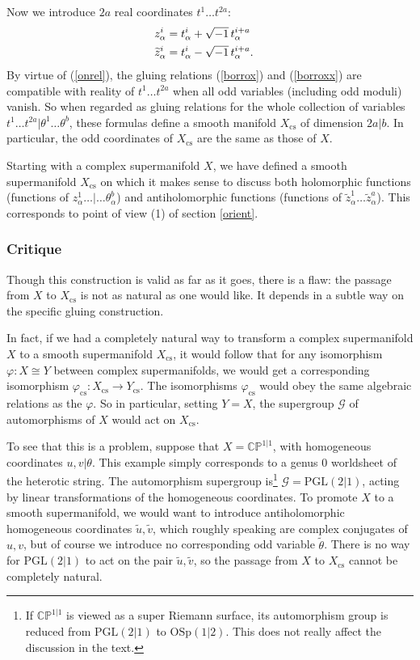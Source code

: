 \documentclass[11pt,a4paper]{article}
\def\t{{ \sf t}}
\def\cs{{\mathrm{cs}}}
\def\tilde{\widetilde}
\def\G{{\mathcal G}}
\def\CP{{\mathbb{CP}}}
\def\t{\tilde }
\def\tilde{\widetilde}
\begin{document}
Now we introduce $2a$ real coordinates $t^1\dots t^{2a}$:
\begin{align}\label{dorsko} z^i_\alpha& = t^i_\alpha+\sqrt{-1}\, t^{i+a}_\alpha \cr
                                         \t z^i_\alpha& = t^i_\alpha -\sqrt{-1}\,t^{i+a}_\alpha. \end{align}
By virtue of (\ref{onrel}), the gluing relations (\ref{borrox}) and (\ref{borroxx}) are compatible with reality of $t^1\dots t^{2a}$ when all odd variables (including odd moduli) vanish.
So when regarded as gluing relations for the whole collection of variables $t^1\dots t^{2a}|\theta^1\dots\theta^b$, these formulas
define a smooth manifold $X_{\cs}$ of dimension $2a|b$.  In particular, the odd coordinates of $X_\cs$ are the same as those of $X$.

Starting with a complex supermanifold $X$, we have defined a smooth supermanifold $X_\cs$ on which it makes sense to discuss both holomorphic functions (functions of $z^1_\alpha\dots|\dots
\theta^b_\alpha$) and antiholomorphic functions (functions of $\t z_\alpha^1\dots \t z^a_\alpha$).  This corresponds to point of view (1) of section \ref{orient}.

\subsubsection{Critique}\label{critique}

Though this construction is valid as far as it goes, there is a flaw: the passage from $X$ to $X_\cs$ is not as natural as one would like.    It depends in a subtle way on the specific
gluing construction.

In fact, if we had a completely natural way to transform a complex supermanifold $X$ to a smooth supermanifold $X_\cs$, it would follow that for any isomorphism $\varphi:X\cong Y$
between complex supermanifolds, we would get a corresponding isomorphism $\varphi_\cs:X_\cs\to Y_\cs$.  The isomorphisms $\varphi_\cs$ would obey the same algebraic
relations as the $\varphi$.  So in particular, setting $Y=X$, the supergroup $\G$ of automorphisms of $X$ would act on $X_\cs$.

To see that this is a problem, suppose that $X=\CP^{1|1}$, with homogeneous coordinates $u,v|\theta$.  This example simply corresponds to a genus 0 worldsheet
of the heterotic string.  The automorphism supergroup is\footnote{If $\CP^{1|1}$ is viewed as a super Riemann surface, its automorphism group is reduced from $\mathrm{PGL}(2|1)$ to 
$\mathrm{OSp}(1|2)$.
This does not really affect the discussion in the text.} $\G=\mathrm{PGL}(2|1)$, acting by linear transformations
of the homogeneous coordinates.  To promote $X$ to a smooth supermanifold, we would want to introduce antiholomorphic homogeneous coordinates $\t u, \t v$, which roughly
speaking are complex conjugates of $u,v$, but of course we introduce no corresponding odd variable $\t\theta$.  There is no way for $\mathrm{PGL}(2|1)$ to act on the pair $\t u,\t v$,
so the passage from $X$ to $X_\cs$ cannot be completely natural.  
\end{document}
